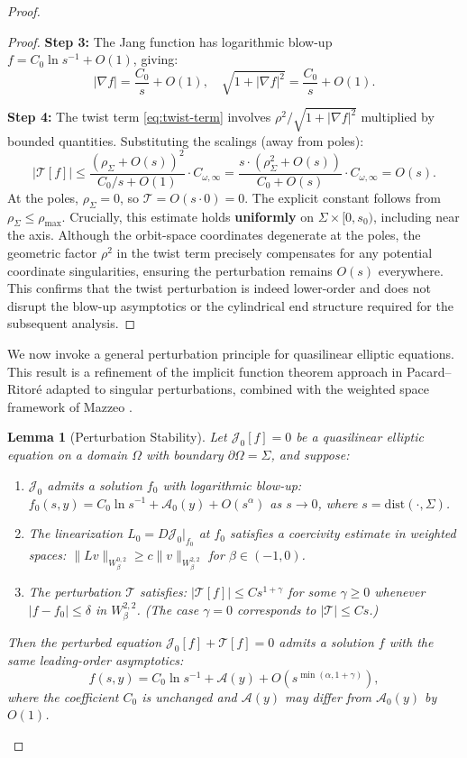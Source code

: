 \documentclass[12pt]{article}
\theoremstyle{plain}
\newtheorem{lemma}[theorem]{Lemma}
\theoremstyle{definition}
\theoremstyle{remark}
\begin{document}
\begin{proof}
\begin{proof}
\textbf{Step 3:} The Jang function has logarithmic blow-up $f = C_0 \ln s^{-1} + O(1)$, giving:
\[
|\nabla f| = \frac{C_0}{s} + O(1), \quad \sqrt{1 + |\nabla f|^2} = \frac{C_0}{s} + O(1).
\]

\textbf{Step 4:} The twist term \eqref{eq:twist-term} involves $\rho^2 / \sqrt{1 + |\nabla f|^2}$ multiplied by bounded quantities. Substituting the scalings (away from poles):
\[
|\mathcal{T}[f]| \leq \frac{(\rho_\Sigma + O(s))^2}{C_0/s + O(1)} \cdot C_{\omega,\infty} = \frac{s \cdot (\rho_\Sigma^2 + O(s))}{C_0 + O(s)} \cdot C_{\omega,\infty} = O(s).
\]
At the poles, $\rho_\Sigma = 0$, so $\mathcal{T} = O(s \cdot 0) = 0$. The explicit constant follows from $\rho_\Sigma \leq \rho_{\max}$.
Crucially, this estimate holds \textbf{uniformly} on $\Sigma \times [0, s_0)$, including near the axis. Although the orbit-space coordinates degenerate at the poles, the geometric factor $\rho^2$ in the twist term precisely compensates for any potential coordinate singularities, ensuring the perturbation remains $O(s)$ everywhere. This confirms that the twist perturbation is indeed lower-order and does not disrupt the blow-up asymptotics or the cylindrical end structure required for the subsequent analysis.
\end{proof}

We now invoke a general perturbation principle for quasilinear elliptic equations. This result is a refinement of the implicit function theorem approach in Pacard--Ritor\'e \cite[Theorem 2.1]{pacarditore2003} adapted to singular perturbations, combined with the weighted space framework of Mazzeo \cite[Section 3]{mazzeo1991}.

\begin{lemma}[Perturbation Stability]\label{lem:perturbation-stability}
Let $\mathcal{J}_0[f] = 0$ be a quasilinear elliptic equation on a domain $\Omega$ with boundary $\partial\Omega = \Sigma$, and suppose:
\begin{enumerate}
    \item[(P1)] $\mathcal{J}_0$ admits a solution $f_0$ with logarithmic blow-up: $f_0(s,y) = C_0 \ln s^{-1} + \mathcal{A}_0(y) + O(s^\alpha)$ as $s \to 0$, where $s = \mathrm{dist}(\cdot, \Sigma)$.
    \item[(P2)] The linearization $L_0 = D\mathcal{J}_0|_{f_0}$ at $f_0$ satisfies a coercivity estimate in weighted spaces: $\|Lv\|_{W^{0,2}_\beta} \geq c\|v\|_{W^{2,2}_\beta}$ for $\beta \in (-1,0)$.
    \item[(P3)] The perturbation $\mathcal{T}$ satisfies: $|\mathcal{T}[f]| \leq C s^{1+\gamma}$ for some $\gamma \geq 0$ whenever $|f - f_0| \leq \delta$ in $W^{2,2}_\beta$. (The case $\gamma = 0$ corresponds to $|\mathcal{T}| \leq Cs$.)
\end{enumerate}
Then the perturbed equation $\mathcal{J}_0[f] + \mathcal{T}[f] = 0$ admits a solution $f$ with the same leading-order asymptotics:
\[
f(s,y) = C_0 \ln s^{-1} + \mathcal{A}(y) + O(s^{\min(\alpha, 1+\gamma)}),
\]
where the coefficient $C_0$ is unchanged and $\mathcal{A}(y)$ may differ from $\mathcal{A}_0(y)$ by $O(1)$.
\end{lemma}


\end{proof}
\end{document}
